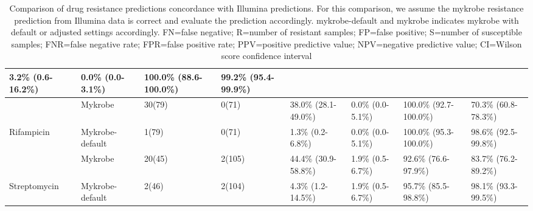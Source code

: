 \begin{table}[]
{\begin{tabular}{|l|l|l|l|l|l|l|l|}
  \cellcolor[HTML]{EFEFEF}3.2\% (0.6-16.2\%) &
  \cellcolor[HTML]{EFEFEF}0.0\% (0.0-3.1\%) &
  \cellcolor[HTML]{EFEFEF}100.0\% (88.6-100.0\%) &
  \cellcolor[HTML]{EFEFEF}99.2\% (95.4-99.9\%) \\ \hline
 &
  Mykrobe &
  30(79) &
  0(71) &
  38.0\% (28.1-49.0\%) &
  0.0\% (0.0-5.1\%) &
  100.0\% (92.7-100.0\%) &
  70.3\% (60.8-78.3\%) \\ \cline{2-8} 
\multirow{-2}{*}{Rifampicin} &
  \cellcolor[HTML]{EFEFEF}Mykrobe-default &
  \cellcolor[HTML]{EFEFEF}1(79) &
  \cellcolor[HTML]{EFEFEF}0(71) &
  \cellcolor[HTML]{EFEFEF}1.3\% (0.2-6.8\%) &
  \cellcolor[HTML]{EFEFEF}0.0\% (0.0-5.1\%) &
  \cellcolor[HTML]{EFEFEF}100.0\% (95.3-100.0\%) &
  \cellcolor[HTML]{EFEFEF}98.6\% (92.5-99.8\%) \\ \hline
 &
  Mykrobe &
  20(45) &
  2(105) &
  44.4\% (30.9-58.8\%) &
  1.9\% (0.5-6.7\%) &
  92.6\% (76.6-97.9\%) &
  83.7\% (76.2-89.2\%) \\ \cline{2-8} 
\multirow{-2}{*}{Streptomycin} &
  \cellcolor[HTML]{EFEFEF}Mykrobe-default &
  \cellcolor[HTML]{EFEFEF}2(46) &
  \cellcolor[HTML]{EFEFEF}2(104) &
  \cellcolor[HTML]{EFEFEF}4.3\% (1.2-14.5\%) &
  \cellcolor[HTML]{EFEFEF}1.9\% (0.5-6.7\%) &
  \cellcolor[HTML]{EFEFEF}95.7\% (85.5-98.8\%) &
  \cellcolor[HTML]{EFEFEF}98.1\% (93.3-99.5\%) \\ \hline
\end{tabular}%
}
\caption{Comparison of \ont{} drug resistance predictions concordance with Illumina predictions. For this comparison, we assume the mykrobe resistance prediction from Illumina data is correct and evaluate the \ont{} prediction accordingly. mykrobe-default and mykrobe indicates mykrobe with default or adjusted settings accordingly. FN=false negative; R=number of resistant samples; FP=false positive; S=number of susceptible samples; FNR=false negative rate; FPR=false positive rate; PPV=positive predictive value; NPV=negative predictive value; CI=Wilson score confidence interval}
\label{tab:mykrobe-settings-geno}
\end{table}
